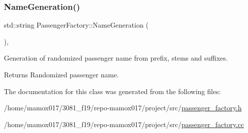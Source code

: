 \subsubsection{\texorpdfstring{Name\+Generation()}{NameGeneration()}}
{\footnotesize\ttfamily std\+::string Passenger\+Factory\+::\+Name\+Generation (\begin{DoxyParamCaption}{ }\end{DoxyParamCaption})\hspace{0.3cm}{\ttfamily [static]}, {\ttfamily [private]}}



Generation of randomized passenger name from prefix, stems and suffixes. 

\begin{DoxyReturn}{Returns}
Randomized passenger name. 
\end{DoxyReturn}


The documentation for this class was generated from the following files\+:\begin{DoxyCompactItemize}
\item 
/home/mamox017/3081\+\_\+f19/repo-\/mamox017/project/src/\hyperlink{passenger__factory_8h}{passenger\+\_\+factory.\+h}\item 
/home/mamox017/3081\+\_\+f19/repo-\/mamox017/project/src/\hyperlink{passenger__factory_8cc}{passenger\+\_\+factory.\+cc}\end{DoxyCompactItemize}
